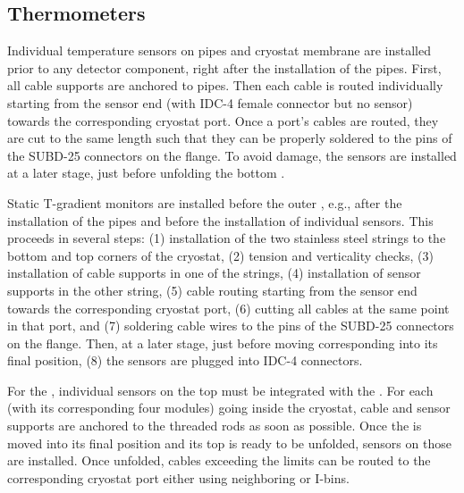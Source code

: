 \subsection{Thermometers}
\label{sec:fdgen-slow-cryo-instal-th}


Individual temperature sensors on pipes and cryostat membrane are installed prior to any detector component, right after the installation of the pipes.
First, all cable supports are anchored to pipes. Then each cable is routed individually starting from the sensor end (with IDC-4 female connector but no sensor)
towards the corresponding cryostat port. Once a port's cables are routed, %
they are cut to the same length such that they can be properly soldered
to the pins of the SUBD-25 connectors on the flange. 
To avoid damage, the sensors are installed at a later stage, just before unfolding the bottom .

Static T-gradient monitors are installed before the outer , e.g., %
after the installation of the pipes
and before the installation of individual sensors. This proceeds in several steps: (1) installation of the two stainless steel strings to the bottom and top corners of the cryostat,
(2) tension and verticality checks, (3) installation of cable supports in one of the strings, (4) installation of sensor supports in the other string, (5) cable routing starting from
the sensor end towards the corresponding cryostat port, (6) cutting all cables at the same point in that port, and (7) soldering cable wires to the pins of the SUBD-25 connectors on the flange. Then, at a later stage, just before moving corresponding  into its final position, (8) the sensors are plugged into IDC-4 connectors. 

For the \single{}, individual sensors on the top  must be integrated with the . For each  (with its corresponding four  modules)
going inside the cryostat, cable and sensor supports are anchored to the  threaded rods as soon as possible.
Once the  is moved into its final position and its top  is ready to be unfolded, sensors on those  are installed. Once unfolded, cables 
exceeding the  limits can be routed to the corresponding cryostat port either using neighboring  or  I-bins. 

